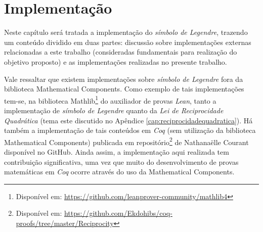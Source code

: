 \chapter{Implementação}
\label{cap:implementacao}

Neste capítulo será tratada a implementação do \textit{símbolo de Legendre}, trazendo um conteúdo dividido em duas partes: discussão sobre implementações externas relacionadas a este trabalho (consideradas fundamentais para realização do objetivo proposto) e as implementações realizadas no presente trabalho.
        
Vale ressaltar que existem implementações sobre \textit{símbolo de Legendre} fora da biblioteca Mathematical Components. Como exemplo de tais implementações tem-se, na biblioteca Mathlib\footnote{Disponível em: \url{https://github.com/leanprover-community/mathlib4}} do auxiliador de provas \textit{Lean}, tanto a implementação de \textit{símbolo de Legendre} quanto da \textit{Lei de Reciprocidade Quadrática}
(tema este discutido no Apêndice \ref{cap:reciprocidadequadratica}). Há também a implementação de tais conteúdos em \textit{Coq} (sem utilização da biblioteca Mathematical Components) publicada em repositório\footnote{Disponível em: \url{https://github.com/Ekdohibs/coq-proofs/tree/master/Reciprocity}} de Nathanaëlle Courant disponível no GitHub. Ainda assim, a implementação aqui realizada tem contribuição significativa, uma vez que muito do desenvolvimento de provas matemáticas em \textit{Coq} ocorre através do uso da Mathematical Components.


